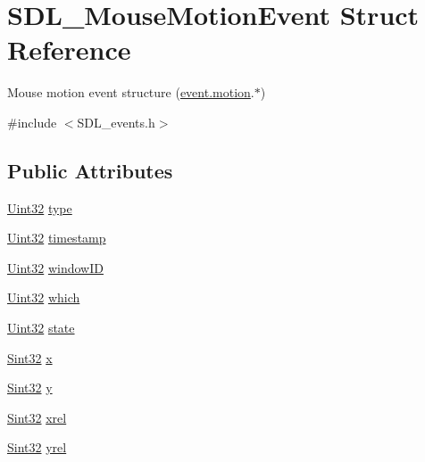 \hypertarget{struct_s_d_l___mouse_motion_event}{\section{S\-D\-L\-\_\-\-Mouse\-Motion\-Event Struct Reference}
\label{struct_s_d_l___mouse_motion_event}
}


Mouse motion event structure (\hyperlink{union_s_d_l___event_ac3c89e190faacbe84280cd539453bab6}{event.\-motion}.$\ast$)  




{\ttfamily \#include $<$S\-D\-L\-\_\-events.\-h$>$}

\subsection*{Public Attributes}
\begin{DoxyCompactItemize}
\item 
\hyperlink{_s_d_l__stdinc_8h_add440eff171ea5f55cb00c4a9ab8672d}{Uint32} \hyperlink{struct_s_d_l___mouse_motion_event_a431dd28cd6db6a7335cf633dbeb80cfb}{type}
\item 
\hyperlink{_s_d_l__stdinc_8h_add440eff171ea5f55cb00c4a9ab8672d}{Uint32} \hyperlink{struct_s_d_l___mouse_motion_event_af530bc0ef327ea6d497c5b1da119841c}{timestamp}
\item 
\hyperlink{_s_d_l__stdinc_8h_add440eff171ea5f55cb00c4a9ab8672d}{Uint32} \hyperlink{struct_s_d_l___mouse_motion_event_aa9976725242ada93a9e18e7fdf5796e6}{window\-I\-D}
\item 
\hyperlink{_s_d_l__stdinc_8h_add440eff171ea5f55cb00c4a9ab8672d}{Uint32} \hyperlink{struct_s_d_l___mouse_motion_event_a6f04c17b4305683915e2fd2dc3c36dbc}{which}
\item 
\hyperlink{_s_d_l__stdinc_8h_add440eff171ea5f55cb00c4a9ab8672d}{Uint32} \hyperlink{struct_s_d_l___mouse_motion_event_a3f6e9bad9d959b824881ba09e05b7024}{state}
\item 
\hyperlink{_s_d_l__stdinc_8h_a7a90b941db9d4582e9ad7abb9940ff7e}{Sint32} \hyperlink{struct_s_d_l___mouse_motion_event_a36398bb4a5308446a262b0bfc8baa80a}{x}
\item 
\hyperlink{_s_d_l__stdinc_8h_a7a90b941db9d4582e9ad7abb9940ff7e}{Sint32} \hyperlink{struct_s_d_l___mouse_motion_event_a7e6a7b1f8713d1968dc913908e8ea448}{y}
\item 
\hyperlink{_s_d_l__stdinc_8h_a7a90b941db9d4582e9ad7abb9940ff7e}{Sint32} \hyperlink{struct_s_d_l___mouse_motion_event_a1c01d9aba2a20778fb45a15dca39ef58}{xrel}
\item 
\hyperlink{_s_d_l__stdinc_8h_a7a90b941db9d4582e9ad7abb9940ff7e}{Sint32} \hyperlink{struct_s_d_l___mouse_motion_event_a7674c8b92d039ab948f671a180fa7b30}{yrel}
\end{DoxyCompactItemize}


